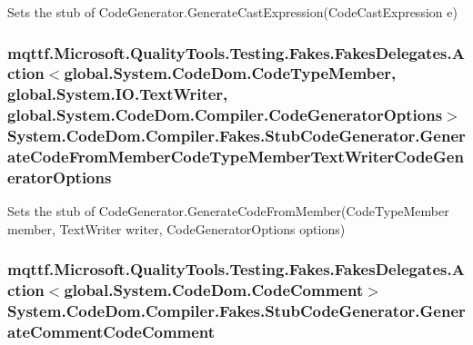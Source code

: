 Sets the stub of Code\-Generator.\-Generate\-Cast\-Expression(\-Code\-Cast\-Expression e)

\hypertarget{class_system_1_1_code_dom_1_1_compiler_1_1_fakes_1_1_stub_code_generator_af071576d31bf1a1fc0a149f4a4cbb4fe}{
\subsubsection[{Generate\-Code\-From\-Member\-Code\-Type\-Member\-Text\-Writer\-Code\-Generator\-Options}]{\setlength{\rightskip}{0pt plus 5cm}mqttf.\-Microsoft.\-Quality\-Tools.\-Testing.\-Fakes.\-Fakes\-Delegates.\-Action$<$global.\-System.\-Code\-Dom.\-Code\-Type\-Member, global.\-System.\-I\-O.\-Text\-Writer, global.\-System.\-Code\-Dom.\-Compiler.\-Code\-Generator\-Options$>$ System.\-Code\-Dom.\-Compiler.\-Fakes.\-Stub\-Code\-Generator.\-Generate\-Code\-From\-Member\-Code\-Type\-Member\-Text\-Writer\-Code\-Generator\-Options}}\label{class_system_1_1_code_dom_1_1_compiler_1_1_fakes_1_1_stub_code_generator_af071576d31bf1a1fc0a149f4a4cbb4fe}


Sets the stub of Code\-Generator.\-Generate\-Code\-From\-Member(\-Code\-Type\-Member member, Text\-Writer writer, Code\-Generator\-Options options)

\hypertarget{class_system_1_1_code_dom_1_1_compiler_1_1_fakes_1_1_stub_code_generator_ab94e3d065682eb64fd8f7bf7a6c99d4c}{
\subsubsection[{Generate\-Comment\-Code\-Comment}]{\setlength{\rightskip}{0pt plus 5cm}mqttf.\-Microsoft.\-Quality\-Tools.\-Testing.\-Fakes.\-Fakes\-Delegates.\-Action$<$global.\-System.\-Code\-Dom.\-Code\-Comment$>$ System.\-Code\-Dom.\-Compiler.\-Fakes.\-Stub\-Code\-Generator.\-Generate\-Comment\-Code\-Comment}}\label{class_system_1_1_code_dom_1_1_compiler_1_1_fakes_1_1_stub_code_generator_ab94e3d065682eb64fd8f7bf7a6c99d4c}


